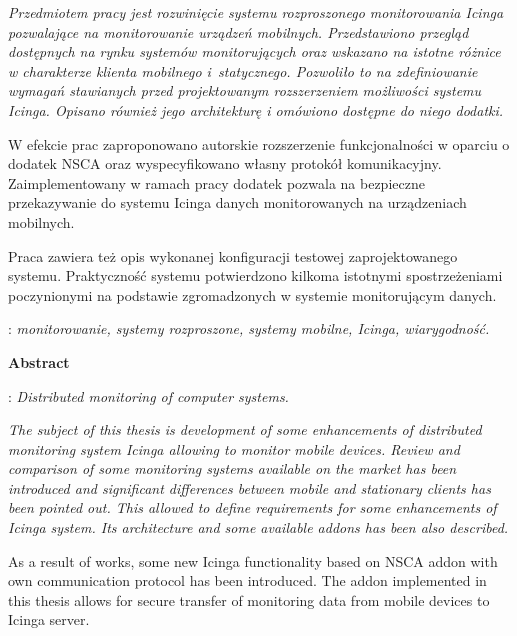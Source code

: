 \begin{titlepage}
    {\itshape Przedmiotem pracy jest rozwinięcie systemu rozproszonego
      monitorowania Icinga pozwalające na monitorowanie urządzeń
      mobilnych. Przedstawiono przegląd dostępnych na rynku systemów
      monitorujących oraz wskazano na istotne różnice w charakterze
      klienta mobilnego i~statycznego. Pozwoliło to na zdefiniowanie
      wymagań stawianych przed projektowanym rozszerzeniem możliwości
      systemu Icinga. Opisano również jego architekturę i omówiono
      dostępne do niego dodatki.

      \indent W efekcie prac zaproponowano autorskie rozszerzenie
      funkcjonalności w oparciu o dodatek NSCA oraz wyspecyfikowano
      własny protokół komunikacyjny. Zaimplementowany w ramach pracy
      dodatek pozwala na bezpieczne przekazywanie do systemu Icinga
      danych monitorowanych na urządzeniach mobilnych.

      \indent Praca zawiera też opis wykonanej konfiguracji testowej
      zaprojektowanego systemu. Praktyczność systemu potwierdzono
      kilkoma istotnymi spostrzeżeniami poczynionymi na podstawie
      zgromadzonych w systemie monitorującym danych.}\vspace*{1\baselineskip}

    : {\itshape monitorowanie,
      systemy rozproszone, systemy mobilne, Icinga, wiarygodność.}
    \par
    \vspace{4\baselineskip}
    \begin{center}
	{\large\bfseries Abstract}\par\bigskip
    \end{center}
    : {\itshape Distributed monitoring of computer
      systems.}\par
    \vspace*{1\baselineskip} {\itshape The subject of this thesis is
      development of some enhancements of distributed monitoring
      system Icinga allowing to monitor mobile devices. Review and
      comparison of some monitoring systems available on the market
      has been introduced and significant differences between mobile
      and stationary clients has been pointed out. This allowed to
      define requirements for some enhancements of Icinga system. Its
      architecture and some available addons has been also described.

      \indent As a result of works, some new Icinga functionality
      based on NSCA addon with own communication protocol has been
      introduced. The addon implemented in this thesis allows for
      secure transfer of monitoring data from mobile devices to Icinga
      server.

}
\end{titlepage}
